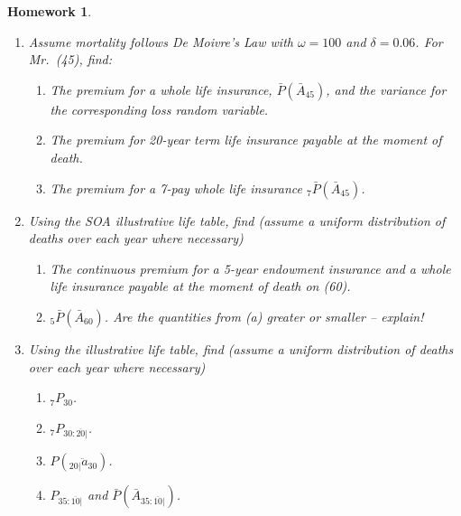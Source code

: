 \documentclass[11pt,fleqn,oneside]{book}
\newtheorem{homework}{Homework}
\begin{document}
\begin{homework}
\label{HW20}
\begin{enumerate}
\item Assume mortality follows De Moivre's Law with $\omega = 100$ and $\delta = 0.06$. For Mr.\ (45), find:
\begin{enumerate}
\item The premium for a whole life insurance, $\bar{P}\left(\bar{A}_{45}\right)$, and the variance for the corresponding loss random variable.
\item The premium for 20-year term life insurance payable at the moment of death.
\item The premium for a 7-pay whole life insurance $_7\bar{P}\left(\bar{A}_{45}\right)$.
\end{enumerate}
\item Using the SOA illustrative life table, find  (assume a uniform distribution of deaths over each year where necessary)
\begin{enumerate}
\item
The continuous premium for a 5-year endowment insurance and a whole life insurance payable at the moment of death on (60).
\item $_5\bar{P}\left(\bar{A}_{60}\right)$. Are the quantities from (a) greater or smaller -- explain!
\end{enumerate}
\item
Using the illustrative life table, find  (assume a uniform distribution of deaths over each year where necessary)
\begin{enumerate}
\item ${_7P_{30}}$.
\item ${_7P_{30:\overline{20}|}}$.
\item $P\left(_{20|}\ddot{a}_{30}\right)$.
\item $P_{35:\overline{10}|}$ and $\bar{P}\left(\bar{A}_{35:\overline{10}|}\right)$.
\end{enumerate}
\end{enumerate}
\end{homework}


\end{document}
